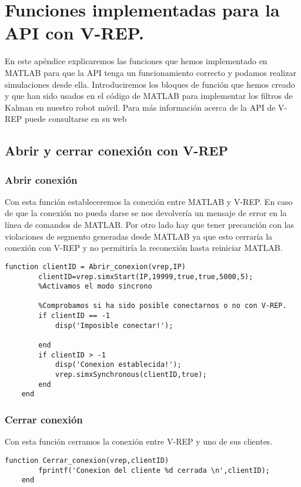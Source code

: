 \pagestyle{scrheadings}
\ihead[]{\rightmark}
\ofoot[]{\thepage{}}
\chapter{Funciones implementadas para la API con V-REP.}\label{ApendiceC}
En este apéndice explicaremos las funciones que hemos implementado en MATLAB para que la API tenga un funcionamiento correcto y podamos realizar simulaciones desde ella.
Introduciremos los bloques de función que hemos creado y que han sido usados en el código de MATLAB para implementar los filtros de Kalman en nuestro robot móvil.
Para más información acerca de la API de V-REP puede consultarse en su web \cite{_v-rep._2016}

\section{Abrir y cerrar conexión con V-REP}
\subsection{Abrir conexión}
Con esta función estableceremos la conexión entre MATLAB y V-REP. 
En caso de que la conexión no pueda darse se nos devolvería un mensaje de error en la línea de comandos de MATLAB.
Por otro lado hay que tener precaución con las violaciones de segmento generadas desde MATLAB ya que esto cerraría la conexión con V-REP y no permitiría la reconexión hasta reiniciar MATLAB.
\lstset{language=Matlab, breaklines=true, basicstyle=\footnotesize}
\lstset{numbers=left, numberstyle=\tiny, stepnumber=1, numbersep=-2pt}
\begin{lstlisting}[frame=single]
function clientID = Abrir_conexion(vrep,IP)
        clientID=vrep.simxStart(IP,19999,true,true,5000,5);
        %Activamos el modo sincrono
        
        %Comprobamos si ha sido posible conectarnos o no con V-REP.
        if clientID == -1
            disp('Imposible conectar!');

        end
        if clientID > -1 
            disp('Conexion establecida!');
            vrep.simxSynchronous(clientID,true);
        end
    end
\end{lstlisting}
\subsection{Cerrar conexión}
Con esta función cerramos la conexión entre V-REP y uno de sus clientes.
\lstset{language=Matlab, breaklines=true, basicstyle=\footnotesize}
\lstset{numbers=left, numberstyle=\tiny, stepnumber=1, numbersep=-2pt}
\begin{lstlisting}[frame=single]
 function Cerrar_conexion(vrep,clientID)
        fprintf('Conexion del cliente %d cerrada \n',clientID);
    end
\end{lstlisting}
